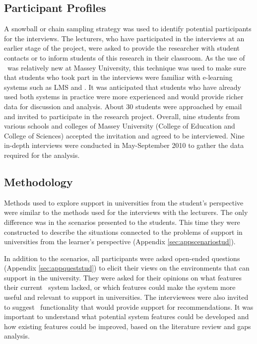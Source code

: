 \subsection{Participant Profiles}

A snowball or chain sampling strategy \citep{Mack2005, Marshall2010} was used to
identify potential participants for the interviews. The lecturers, who have
participated in the interviews at an earlier stage of the project, were asked to
provide the researcher with student contacts or to inform students of this
research in their classroom. As the use of \ep~was relatively new at Massey
University, this technique was used to make sure that students who took part in
the interviews were familiar with e-learning systems such as LMS and \ep. It was
anticipated that students who have already used both systems in practice were
more experienced and would provide richer data for discussion and analysis.
About 30 students were approached by email and invited to participate in the
research project. Overall, nine students from various schools and colleges of
Massey University (College of Education and College of Sciences) accepted the
invitation and agreed to be interviewed. Nine in-depth interviews were conducted
in May-September 2010 to gather the data required for the analysis.

\subsection{Methodology}

Methods used to explore \LLLs support in universities from the student's
perspective were similar to the methods used for the interviews with the
lecturers. The only difference was in the scenarios presented to the students.
This time they were constructed to describe the situations connected to the
problems of \LLLs support in universities from the learner's perspective
(Appendix \ref{sec:appscenariostud}).

In addition to the scenarios, all participants were asked open-ended questions
(Appendix \ref{sec:appqueststud}) to elicit their views on the environments that
can support \LLLs in the university. They were asked for their opinions on what
features their current \ep~system lacked, or which features could make the
system more useful and relevant to \LLLs support in universities. The
interviewees were also invited to suggest \ep~functionality that would provide
support for \LLLs recommendations. It was important to understand what potential
system features could be developed and how existing features could be improved,
based on the literature review and gaps analysis.

